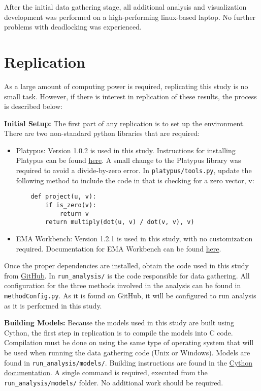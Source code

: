After the initial data gathering stage, all additional analysis and visualization development was performed on a high-performing linux-based laptop. No further problems with deadlocking was experienced. 

\section{Replication}
As a large amount of computing power is required, replicating this study is no small task. However, if there is interest in replication of these results, the process is described below: 

\textbf{Initial Setup: } The first part of any replication is to set up the environment. There are two non-standard python libraries that are required: 

\begin{itemize}
    \item Platypus: Version 1.0.2 is used in this study. Instructions for installing Platypus can be found \href{http://platypus.readthedocs.io/en/latest/getting-started.html#installing-platypus}{here}. A small change to the Platypus library was required to avoid a divide-by-zero error. In \texttt{platypus/tools.py}, update the following method to include the code in that is checking for a zero vector, v: 
    
    \begin{lstlisting}
    def project(u, v):
        if is_zero(v):
            return v
        return multiply(dot(u, v) / dot(v, v), v)
    \end{lstlisting}
    
    \item EMA Workbench: Version 1.2.1 is used in this study, with no customization required. Documentation for EMA Workbench can be found \href{https://emaworkbench.readthedocs.io/en/latest/}{here}.
\end{itemize}

Once the proper dependencies are installed, obtain the code used in this study from \href{https://github.com/eebart/RobustDecisionSupportComparison}{GitHub}. In \texttt{run_analysis/} is the code responsible for data gathering. All configuration for the three methods involved in the analysis can be found in \texttt{methodConfig.py}. As it is found on GitHub, it will be configured to run analysis as it is performed in this study.

\textbf{Building Models: } Because the models used in this study are built using Cython, the first step in replication is to compile the models into C code. Compilation must be done on using the same type of operating system that will be used when running the data gathering code (Unix or Windows). Models are found in \texttt{run_analysis/models/}. Building instructions are found in the \href{http://docs.cython.org/en/latest/src/quickstart/build.html#building-a-cython-module-using-distutils}{Cython documentation}. A single command is required, executed from the \texttt{run_analysis/models/} folder. No additional work should be required.


